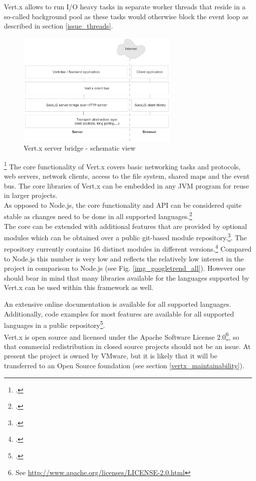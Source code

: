 Vert.x allows to run I/O heavy tasks in separate worker threads that reside in a
so-called background pool as these tasks would otherwise block the event loop as
described in section \ref{issue_threads}.

\begin{figure}[htb]
\centering
\includegraphics[width=0.7\textwidth]{img/vertx_server_bridge.pdf}
\caption[Vert.x server bridge]{Vert.x server bridge - schematic view}
\label{fig:server_bridge}
\end{figure}
\footcitetext{req_res}
%
The core functionality of Vert.x covers basic networking tasks and protocols,
web servers, network clients, access to the file system, shared maps and the event bus.
The core libraries of Vert.x can be embedded in any JVM program for reuse in
larger projects.\\
As opposed to Node.js, the core functionality and API can be considered quite
stable as changes need to be done in all supported languages.\footcite[Cf.][]{vertx_2012}\\ %
The core can be extended with additional features that are provided by optional
modules which can be obtained over a public git-based module
repository.\footcite[Cf.][]{vertx_mod_2012}.
The repository currently contains 16 distinct modules in different
versions.\footcite[Cf.][]{Vertx_repository_2012} Compared to Node.js this
number is very low and reflects the relatively low interest in the project
in comparison to Node.js (see Fig. \ref{img_googletrend_all}).
However one should bear in mind that many libraries available for the languages supported
by Vert.x can be used within this framework as well.

An extensive online documentation is available for all supported languages.
Additionally, code examples for most features are available for all supported languages in
a public repository\footcite[Cf.][]{Fox_2013}.\\
Vert.x is open source and licensed under the Apache Software License
2.0\footnote{See \url{http://www.apache.org/licenses/LICENSE-2.0.html}}, so that
commecial redistribution in closed source projects should not be an issue.
At present the project is owned by VMware, but it is likely that it will be transferred to
an Open Source foundation (see section \ref{vertx_maintainability}).


